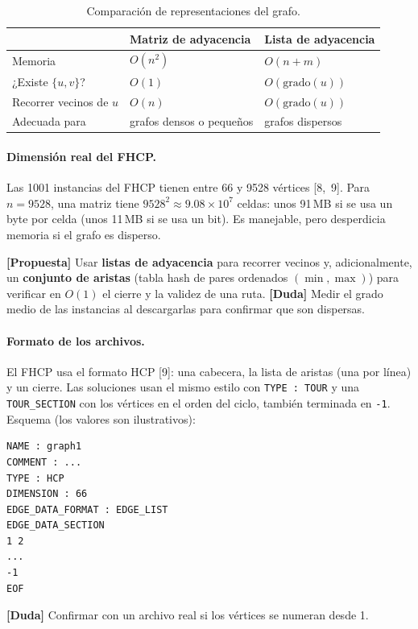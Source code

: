 \documentclass[11pt,letterpaper]{article}
\theoremstyle{definition}
\newcommand{\prop}{\textcolor{green!40!black}{\textbf{[Propuesta]}}}
\newcommand{\duda}{\textcolor{red!60!black}{\textbf{[Duda]}}}
\begin{document}
\begin{table}[h]
\centering
\caption{Comparación de representaciones del grafo.}
\label{tab:repr-grafo}
\begin{tabular}{@{}lll@{}}
\toprule
 & Matriz de adyacencia & Lista de adyacencia \\
\midrule
Memoria                         & $O(n^2)$ & $O(n+m)$ \\
¿Existe $\{u,v\}$?              & $O(1)$   & $O(\text{grado}(u))$ \\
Recorrer vecinos de $u$         & $O(n)$   & $O(\text{grado}(u))$ \\
Adecuada para                   & grafos densos o pequeños & grafos dispersos \\
\bottomrule
\end{tabular}
\end{table}

\paragraph{Dimensión real del FHCP.} Las 1001 instancias del FHCP tienen entre 66 y 9528
vértices [8,~9]. Para $n=9528$, una matriz tiene $9528^2\approx 9.08\times10^7$ celdas:
unos 91\,MB si se usa un byte por celda (unos 11\,MB si se usa un bit). Es manejable, pero
desperdicia memoria si el grafo es disperso.

\prop{} Usar \textbf{listas de adyacencia} para recorrer vecinos y, adicionalmente, un
\textbf{conjunto de aristas} (tabla hash de pares ordenados $(\min,\max)$) para verificar en
$O(1)$ el cierre y la validez de una ruta. \duda{} Medir el grado medio de las instancias
al descargarlas para confirmar que son dispersas.

\paragraph{Formato de los archivos.} El FHCP usa el formato HCP [9]: una cabecera, la lista
de aristas (una por línea) y un cierre. Las soluciones usan el mismo estilo con
\texttt{TYPE : TOUR} y una \texttt{TOUR\_SECTION} con los vértices en el orden del ciclo,
también terminada en \texttt{-1}. Esquema (los valores son ilustrativos):
\begin{center}
\begin{minipage}{0.42\textwidth}
\small
\begin{verbatim}
NAME : graph1
COMMENT : ...
TYPE : HCP
DIMENSION : 66
EDGE_DATA_FORMAT : EDGE_LIST
EDGE_DATA_SECTION
1 2
...
-1
EOF
\end{verbatim}
\end{minipage}
\end{center}
\duda{} Confirmar con un archivo real si los vértices se numeran desde 1.
\end{document}

